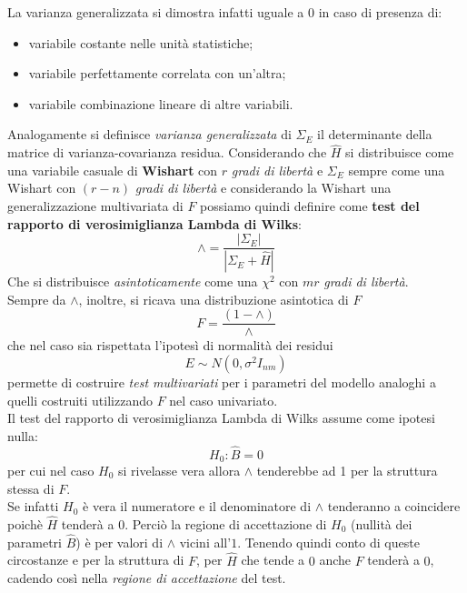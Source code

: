 \documentclass[a4page, 11pt]{article} %
\begin{document}
La varianza generalizzata si dimostra infatti uguale a $0$ in caso di presenza di:
\begin{itemize}[noitemsep]
\item variabile costante nelle unità statistiche;
\item variabile perfettamente correlata con un'altra;
\item variabile combinazione lineare di altre variabili.
\end{itemize}
Analogamente si definisce \textit{varianza generalizzata} di $\Sigma_E$ il determinante della matrice di varianza-covarianza residua. 
\newline
\newline
Considerando che $\hat{H}$ si distribuisce come una variabile casuale di \textbf{Wishart} con $r$ \textit{gradi di libertà} e $\Sigma_E$ sempre come una Wishart con $(r-n)$ \textit{gradi di libertà} e considerando la Wishart una generalizzazione multivariata di $F$ possiamo quindi definire come \textbf{test del rapporto di verosimiglianza Lambda di Wilks}: \begin{equation*}
\wedge= \frac{|\Sigma_E|}{|\Sigma_E + \hat{H}|} 
\end{equation*}
Che si distribuisce \textit{asintoticamente} come una $\chi^2$ con $mr$ \textit{gradi di libertà}. \\
Sempre da $\wedge$, inoltre, si ricava una distribuzione asintotica di $F$
\begin{equation*}
F = \frac{(1-\wedge)}{\wedge}
\end{equation*}
che nel caso sia rispettata l'ipotesì di normalità dei residui
\begin{equation*}
E \sim N(0,\sigma^2 I_{nm})
\end{equation*}
permette di costruire \textit{test multivariati} per i parametri  del modello analoghi a quelli costruiti utilizzando $F$ nel caso univariato.\\
Il test del rapporto di verosimiglianza Lambda di Wilks assume come ipotesi nulla: 
\begin{equation*}
H_0:\hat{B} = 0 
\end{equation*} 
per cui nel caso $H_0$ si rivelasse vera allora $\wedge$ tenderebbe ad 1 per la struttura stessa di $F$. \\
Se infatti $H_0$ è vera il numeratore e il denominatore di $\wedge$ tenderanno a coincidere poichè $\hat{H}$ tenderà a $0$. Perciò la regione di accettazione di $H_0$ (nullità dei parametri $\hat{B}$) è per valori di $\wedge$ vicini all’$1$. Tenendo quindi conto di queste circostanze e per la struttura di $F$, per $\hat{H}$ che tende a $0$ anche $F$ tenderà a $0$, cadendo così nella \textit{regione di accettazione} del test.
\end{document}
